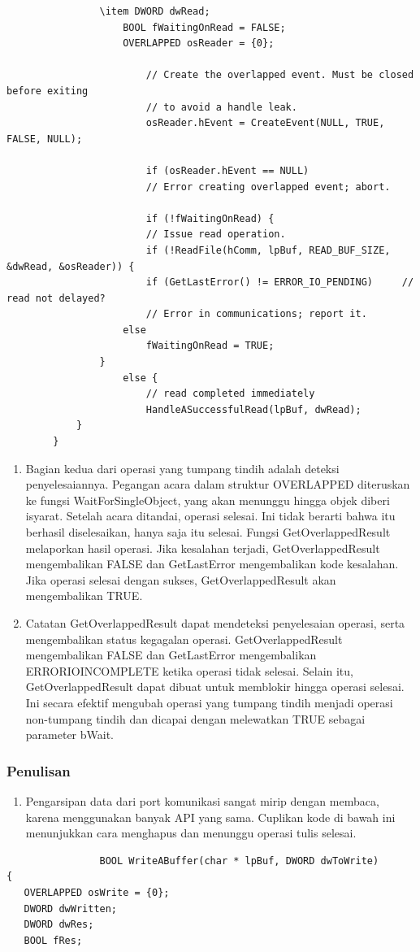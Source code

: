 \begin{enumerate}
\begin{enumerate}
				\begin{verbatim}
				\item DWORD dwRead;
					BOOL fWaitingOnRead = FALSE;
					OVERLAPPED osReader = {0};

						// Create the overlapped event. Must be closed before exiting
						// to avoid a handle leak.
						osReader.hEvent = CreateEvent(NULL, TRUE, FALSE, NULL);

						if (osReader.hEvent == NULL)
						// Error creating overlapped event; abort.

						if (!fWaitingOnRead) {
						// Issue read operation.
						if (!ReadFile(hComm, lpBuf, READ_BUF_SIZE, &dwRead, &osReader)) {
						if (GetLastError() != ERROR_IO_PENDING)     // read not delayed?
						// Error in communications; report it.
					else
						fWaitingOnRead = TRUE;
				}
					else {    
						// read completed immediately
						HandleASuccessfulRead(lpBuf, dwRead);
			}
		}
				\end{verbatim}

				\begin{enumerate}
						\item Bagian kedua dari operasi yang tumpang tindih adalah deteksi penyelesaiannya. Pegangan acara dalam struktur OVERLAPPED diteruskan ke fungsi WaitForSingleObject, yang akan menunggu hingga objek diberi isyarat. Setelah acara ditandai, operasi selesai. Ini tidak berarti bahwa itu berhasil diselesaikan, hanya saja itu selesai. Fungsi GetOverlappedResult melaporkan hasil operasi. Jika kesalahan terjadi, GetOverlappedResult mengembalikan FALSE dan GetLastError mengembalikan kode kesalahan. Jika operasi selesai dengan sukses, GetOverlappedResult akan mengembalikan TRUE.

						
						\item Catatan GetOverlappedResult dapat mendeteksi penyelesaian operasi, serta mengembalikan status kegagalan operasi. GetOverlappedResult mengembalikan FALSE dan GetLastError mengembalikan ERRORIOINCOMPLETE ketika operasi tidak selesai. Selain itu, GetOverlappedResult dapat dibuat untuk memblokir hingga operasi selesai. Ini secara efektif mengubah operasi yang tumpang tindih menjadi operasi non-tumpang tindih dan dicapai dengan melewatkan TRUE sebagai parameter bWait.
				\end{enumerate}


			
		\end{enumerate}
			\subsubsection{Penulisan}
				\begin{enumerate}
					\item Pengarsipan data dari port komunikasi sangat mirip dengan membaca, karena menggunakan banyak API yang sama. Cuplikan kode di bawah ini menunjukkan cara menghapus dan menunggu operasi tulis selesai.
				\end{enumerate}
				\begin{verbatim}
				BOOL WriteABuffer(char * lpBuf, DWORD dwToWrite)
{
   OVERLAPPED osWrite = {0};
   DWORD dwWritten;
   DWORD dwRes;
   BOOL fRes;


\end{verbatim}
\end{enumerate}
